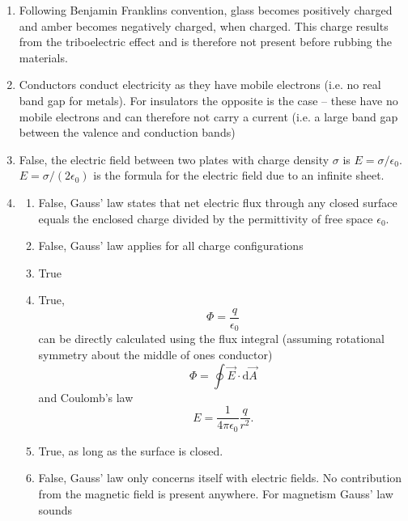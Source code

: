   \begin{answers}
    \begin{enumerate}
      \item Following Benjamin Franklins convention, glass becomes positively charged and amber becomes negatively charged, when charged.
        This charge results from the triboelectric effect and is therefore not present before rubbing the materials. 
      \item Conductors conduct electricity as they have mobile electrons (i.e. no real band gap for metals).
        For insulators the opposite is the case -- these have no mobile electrons and can therefore not carry a current (i.e. a large band gap between the valence and conduction bands)
      \item False, the electric field between two plates with charge density $\sigma$ is $E = \sigma / \epsilon_0$.
        $E = \sigma / (2 \epsilon_0)$ is the formula for the electric field due to an infinite sheet.
      \item \begin{enumerate}
          \item False, Gauss' law states that net electric flux through any closed surface equals the enclosed charge divided by the permittivity of free space $\epsilon_0$. 
          \item False, Gauss' law applies for all charge configurations
          \item True
          \item True,
            \begin{equation*}
              \Phi = \frac{q}{\epsilon_0}
            \end{equation*}
            can be directly calculated using the flux integral (assuming rotational symmetry about the middle of ones conductor)
            \begin{equation*}
              \Phi = \oint \Vec{E} \cdot \mathrm{d} \Vec{A}
            \end{equation*}
            and Coulomb's law
            \begin{equation*}
              E = \frac{1}{4\pi \epsilon_0} \frac{q}{r^2}
            .\end{equation*}
          \item True, as long as the surface is closed.
          \item False, Gauss' law only concerns itself with electric fields. No contribution from the magnetic field is present anywhere.
            For magnetism Gauss' law sounds

\end{enumerate}
\end{enumerate}
\end{answers}
